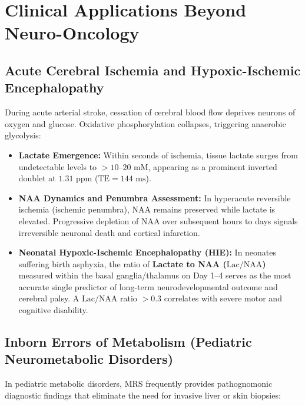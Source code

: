 \documentclass[11pt,a4paper]{article}
\begin{document}
\section{Clinical Applications Beyond Neuro-Oncology}

\subsection{Acute Cerebral Ischemia and Hypoxic-Ischemic Encephalopathy}
During acute arterial stroke, cessation of cerebral blood flow deprives neurons of oxygen and glucose. Oxidative phosphorylation collapses, triggering anaerobic glycolysis:
\begin{itemize}[leftmargin=2em]
    \item \textbf{Lactate Emergence:} Within seconds of ischemia, tissue lactate surges from undetectable levels to $> 10\text{--}20\text{ mM}$, appearing as a prominent inverted doublet at $1.31\text{ ppm}$ ($\text{TE} = 144\text{ ms}$).
    \item \textbf{NAA Dynamics and Penumbra Assessment:} In hyperacute reversible ischemia (ischemic penumbra), NAA remains preserved while lactate is elevated. Progressive depletion of NAA over subsequent hours to days signals irreversible neuronal death and cortical infarction.
    \item \textbf{Neonatal Hypoxic-Ischemic Encephalopathy (HIE):} In neonates suffering birth asphyxia, the ratio of \textbf{Lactate to NAA ($\text{Lac}/\text{NAA}$)} measured within the basal ganglia/thalamus on Day 1--4 serves as the most accurate single predictor of long-term neurodevelopmental outcome and cerebral palsy. A $\text{Lac}/\text{NAA}$ ratio $> 0.3$ correlates with severe motor and cognitive disability.
\end{itemize}

\subsection{Inborn Errors of Metabolism (Pediatric Neurometabolic Disorders)}
In pediatric metabolic disorders, MRS frequently provides pathognomonic diagnostic findings that eliminate the need for invasive liver or skin biopsies:
\end{document}
